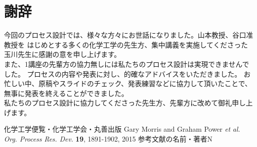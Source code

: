 \documentclass[a4j]{jsreport}
\begin{document}
\newpage
\chapter*{謝辞}
今回のプロセス設計では、様々な方々にお世話になりました。山本教授、谷口准教授を
はじめとする多くの化学工学の先生方、集中講義を実施してくださった玉川先生に感謝の意を申し上げます。\\
また、1講座の先輩方の協力無しには私たちのプロセス設計は実現できませんでした。
プロセスの内容や発表に対し、的確なアドバイスをいただきました。
お忙しい中、原稿やスライドのチェック、発表練習などに協力して頂いたことで、無事に発表を終えることができました。\\
私たちのプロセス設計に協力してくださった先生方、先輩方に改めて御礼申し上げます。

\newpage
\begin{thebibliography}{10}
     化学工学便覧・化学工学会・丸善出版
     Gary Morris and  Graham Power {\it et al.  Org. Process Res. Dev.} {\bf 19}, 1891-1902, 2015
     参考文献の名前・著者N
\end{thebibliography}

\newpage
\end{document}
